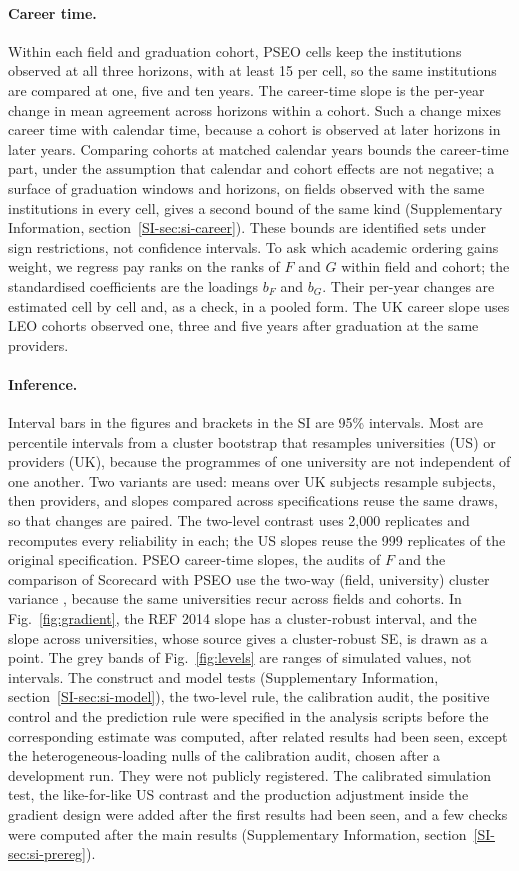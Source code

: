 \documentclass[11pt]{article}
\newcommand{\SIsec}[1]{Supplementary Information, section~\ref{SI-#1}}
\begin{document}
\paragraph{Career time.} Within each field and graduation cohort, PSEO cells keep the institutions observed at all
three horizons, with at least 15 per cell, so the same institutions are compared at one, five and ten years. The
career-time slope is the per-year change in mean agreement across horizons within a cohort. Such a change mixes
career time with calendar time, because a cohort is observed at later horizons in later years. Comparing cohorts at
matched calendar years bounds the career-time part, under the assumption that calendar and cohort effects are not
negative; a surface of graduation windows and horizons, on fields observed with the same institutions in every cell,
gives a second bound of the same kind (\SIsec{sec:si-career}). These bounds are identified sets under sign
restrictions, not confidence intervals. To ask which academic ordering gains weight, we regress pay ranks on the ranks
of $F$ and $G$ within field and cohort; the standardised coefficients are the loadings $b_F$ and $b_G$. Their per-year
changes are estimated cell by cell and, as a check, in a pooled form. The UK career slope uses LEO cohorts observed
one, three and five years after graduation at the same providers.

\paragraph{Inference.} Interval bars in the figures and brackets in the SI are 95\% intervals. Most are percentile
intervals from a cluster bootstrap that resamples universities (US) or providers (UK), because the programmes of one
university are not independent of one another. Two variants are used: means over UK subjects resample subjects, then
providers, and slopes compared across specifications reuse the same draws, so that changes are paired. The two-level
contrast uses 2,000 replicates and recomputes every reliability in each; the US slopes reuse the 999 replicates of
the original specification. PSEO career-time slopes, the audits of $F$ and the comparison of Scorecard with PSEO use
the two-way (field, university) cluster variance \citep{cameron2011robust}, because the same universities recur across
fields and cohorts. In Fig.~\ref{fig:gradient}, the REF 2014 slope has a cluster-robust interval, and the slope across
universities, whose source gives a cluster-robust SE, is drawn as a point. The grey bands of
Fig.~\ref{fig:levels} are ranges of simulated values, not intervals. The construct and model tests (\SIsec{sec:si-model}), the two-level rule, the
calibration audit, the positive control and the prediction rule were specified in the analysis scripts before the
corresponding estimate was computed, after related results had been seen, except the heterogeneous-loading nulls of the
calibration audit, chosen after a development run. They were not publicly registered. The calibrated simulation test, the
like-for-like US contrast and the production adjustment inside the gradient design were added after the first results
had been seen, and a few checks were computed after the main results (\SIsec{sec:si-prereg}).
\end{document}

